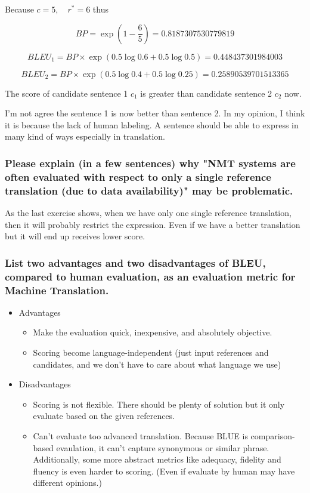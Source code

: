\documentclass[12pt, letterpaper]{article}
\begin{document}
Because $c = 5,\quad r^* = 6$ thus

$$
BP = \exp(1 - \frac{6}{5}) = 0.8187307530779819
$$

$$
BLEU_1 = BP \times \exp(0.5 \log 0.6 + 0.5 \log 0.5) = 0.448437301984003
$$

$$
BLEU_2 = BP \times \exp(0.5 \log 0.4 + 0.5 \log 0.25) = 0.25890539701513365
$$

The score of candidate sentence 1 $c_1$ is greater than candidate sentence 2 $c_2$ now.

I'm not agree the sentence 1 is now better than sentence 2. In my opinion, I think it is because the lack of human labeling. A sentence should be able to express in many kind of ways especially in translation.

\subsubsection{Please explain (in a few sentences) why "NMT systems are often evaluated with respect to only a single reference translation (due to data availability)" may be problematic.}

As the last exercise shows, when we have only one single reference translation, then it will probably restrict the expression. Even if we have a better translation but it will end up receives lower score.

\subsubsection{List two advantages and two disadvantages of BLEU, compared to human evaluation, as an evaluation metric for Machine Translation.}

\begin{itemize}[topsep=0pt, partopsep=0pt]
  \item Advantages {
    \begin{itemize}
      \item Make the evaluation quick, inexpensive, and absolutely objective.
      \item Scoring become language-independent (just input references and candidates, and we don't have to care about what language we use)
    \end{itemize}
  }
  \item Disadvantages {
    \begin{itemize}
      \item Scoring is not flexible. There should be plenty of solution but it only evaluate based on the given references.
      \item Can't evaluate too advanced translation. Because BLUE is comparison-based evaulation, it can't capture synonymous or similar phrase. Additionally, some more abstract metrics like adequacy, fidelity and fluency is even harder to scoring. (Even if evaluate by human may have different opinions.)
    \end{itemize}
  }
\end{itemize}
\end{document}
